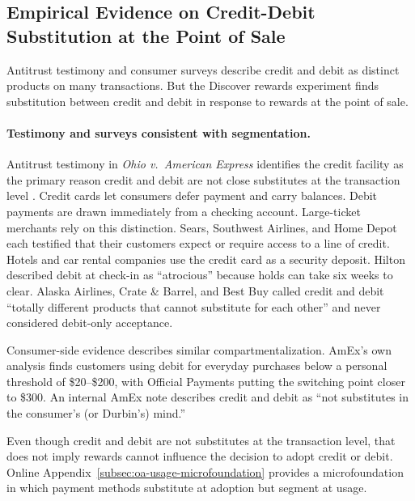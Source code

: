 \documentclass[main.tex]{subfiles}
\begin{document}

\subsection{Empirical Evidence on Credit-Debit Substitution at the Point of Sale}
\label{subsec:oa-credit-debit-evidence}\label{subsubsec:oa-credit-debit-evidence}

Antitrust testimony and consumer surveys describe credit and debit as distinct products on many transactions.
But the Discover rewards experiment finds substitution between credit and debit in response to rewards at the point of sale.

\paragraph{Testimony and surveys consistent with segmentation.}
Antitrust testimony in \emph{Ohio v.\ American Express} identifies the credit facility as the primary reason credit and debit are not close substitutes at the transaction level \parencite{Conrath2014}.
Credit cards let consumers defer payment and carry balances. Debit payments are drawn immediately from a checking account.
Large-ticket merchants rely on this distinction.
Sears, Southwest Airlines, and Home Depot each testified that their customers expect or require access to a line of credit.
Hotels and car rental companies use the credit card as a security deposit. Hilton described debit at check-in as ``atrocious'' because holds can take six weeks to clear.
Alaska Airlines, Crate \& Barrel, and Best Buy called credit and debit ``totally different products that cannot substitute for each other'' and never considered debit-only acceptance.

Consumer-side evidence describes similar compartmentalization.
AmEx's own analysis finds customers using debit for everyday purchases below a personal threshold of \$20--\$200, with Official Payments putting the switching point closer to \$300.
An internal AmEx note describes credit and debit as ``not substitutes in the consumer's (or Durbin's) mind.''

Even though credit and debit are not substitutes at the transaction level, that does not imply rewards cannot influence the decision to adopt credit or debit. Online Appendix~\ref{subsec:oa-usage-microfoundation} provides a microfoundation in which payment methods substitute at adoption but segment at usage.
\end{document}
